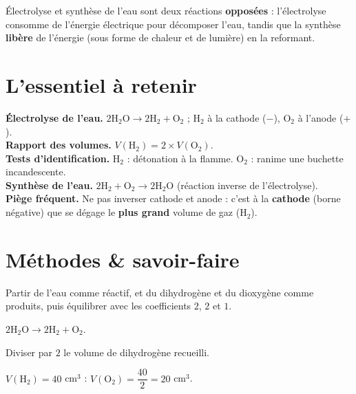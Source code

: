 \begin{remarque}
Électrolyse et synthèse de l'eau sont deux réactions \textbf{opposées} : l'électrolyse
consomme de l'énergie électrique pour décomposer l'eau, tandis que la synthèse
\textbf{libère} de l'énergie (sous forme de chaleur et de lumière) en la reformant.
\end{remarque}

\section{L'essentiel à retenir}

\begin{synthese}
\textbf{Électrolyse de l'eau.} $2\mathrm{H_2O}\to2\mathrm{H_2}+\mathrm{O_2}$ ;
$\mathrm{H_2}$ à la cathode ($-$), $\mathrm{O_2}$ à l'anode ($+$).\\[4pt]
\textbf{Rapport des volumes.} $V(\mathrm{H_2})=2\times V(\mathrm{O_2})$.\\[4pt]
\textbf{Tests d'identification.} $\mathrm{H_2}$ : détonation à la flamme. $\mathrm{O_2}$ :
ranime une buchette incandescente.\\[4pt]
\textbf{Synthèse de l'eau.} $2\mathrm{H_2}+\mathrm{O_2}\to2\mathrm{H_2O}$ (réaction inverse
de l'électrolyse).\\[4pt]
\textbf{Piège fréquent.} Ne pas inverser cathode et anode : c'est à la \textbf{cathode}
(borne négative) que se dégage le \textbf{plus grand} volume de gaz ($\mathrm{H_2}$).
\end{synthese}

\section{Méthodes \& savoir-faire}

Partir de l'eau comme réactif, et du dihydrogène et du dioxygène comme produits, puis
équilibrer avec les coefficients $2$, $2$ et $1$.
\begin{exemple}
$2\mathrm{H_2O}\to2\mathrm{H_2}+\mathrm{O_2}$.
\end{exemple}

Diviser par $2$ le volume de dihydrogène recueilli.
\begin{exemple}
$V(\mathrm{H_2})=40$ cm$^{3}$ : $V(\mathrm{O_2})=\dfrac{40}2=20$ cm$^{3}$.
\end{exemple}

